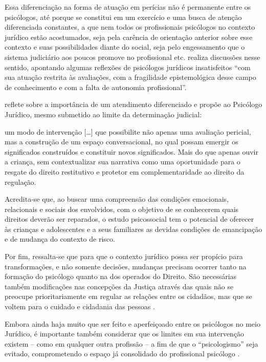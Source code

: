 Essa diferenciação na forma de atuação em perícias não é permanente entre os psicólogos, até porque se constitui em um exercício e uma busca de atenção diferenciada constantes, a que nem todos os profissionais psicólogos no contexto jurídico estão acostumados, seja pela carência de orientação anterior sobre esse contexto e suas possibilidades diante do social, seja pelo engessamento que o sistema judiciário aos poucos promove no profissional etc.  realiza discussões nesse sentido, apontando algumas reflexões de psicólogos jurídicos insatisfeitos ``com sua atuação restrita às avaliações, com a fragilidade epistemológica desse campo de conhecimento e com a falta de autonomia profissional''.

 reflete sobre a importância de um atendimento diferenciado e propõe ao Psicólogo Jurídico, mesmo submetido ao limite da determinação judicial:

\begin{citacao}
	um modo de intervenção [\ldots] que possibilite não apenas uma avaliação pericial, mas a construção de um espaço conversacional, no qual possam emergir os significados construídos e constituir novos significados. Mais do que apenas ouvir a criança, sem contextualizar sua narrativa como uma oportunidade para o resgate do direito restitutivo e protetor em complementaridade ao direito da regulação. 

	Acredita-se que, ao buscar uma compreensão das condições emocionais, relacionais e sociais dos envolvidos, com o objetivo de se conhecerem quais direitos deverão ser reparados, o estudo psicossocial tem o potencial de oferecer às crianças e adolescentes e a seus familiares as devidas condições de emancipação e de mudança do contexto de risco.
\end{citacao}

Por fim, ressalta-se que para que o contexto jurídico possa ser propício para transformações, e não somente decisões, mudanças precisam ocorrer tanto na formação do psicólogo quanto na dos operados do Direito. São necessárias também modificações nas concepções da Justiça através das quais não se preocupe prioritariamente em regular as relações entre os cidadãos, mas que se voltem para o cuidado e cidadania das pessoas \cite{COSTA2009}. 

Embora ainda haja muito que ser feito e aperfeiçoado entre os psicólogos no meio Jurídico, é importante também considerar que os limites em sua intervenção existem -- como em qualquer outra profissão -- a fim de que o ``psicologismo'' seja evitado, comprometendo o espaço já consolidado do profissional psicólogo \cite[p. 34]{JESUS2001}.